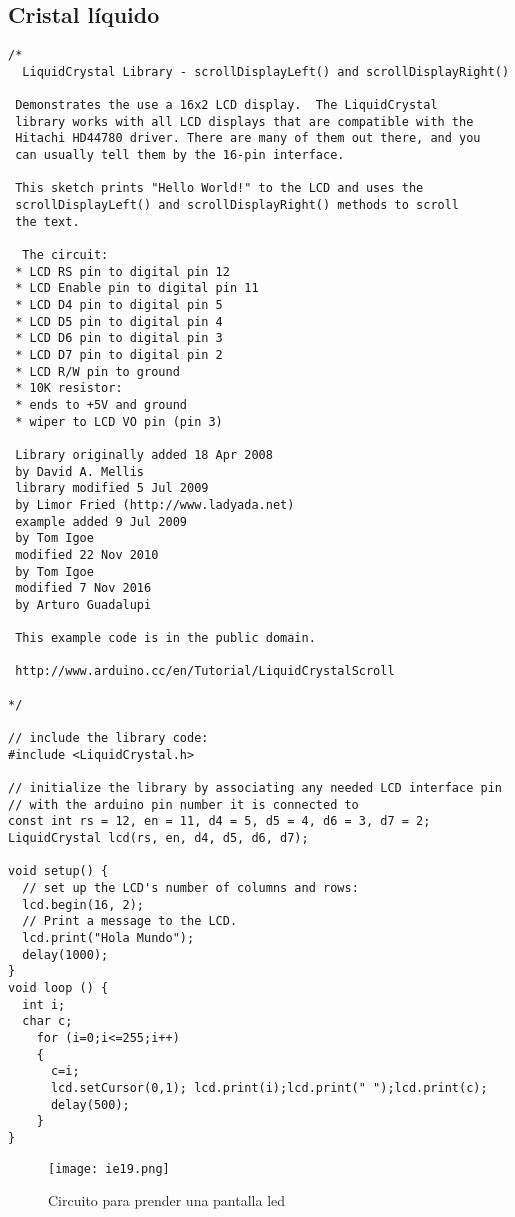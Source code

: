 \subsection{Cristal líquido}
\begin{lstlisting}[style=cFrameTB, gobble=4]
/*
  LiquidCrystal Library - scrollDisplayLeft() and scrollDisplayRight()

 Demonstrates the use a 16x2 LCD display.  The LiquidCrystal
 library works with all LCD displays that are compatible with the
 Hitachi HD44780 driver. There are many of them out there, and you
 can usually tell them by the 16-pin interface.

 This sketch prints "Hello World!" to the LCD and uses the
 scrollDisplayLeft() and scrollDisplayRight() methods to scroll
 the text.

  The circuit:
 * LCD RS pin to digital pin 12
 * LCD Enable pin to digital pin 11
 * LCD D4 pin to digital pin 5
 * LCD D5 pin to digital pin 4
 * LCD D6 pin to digital pin 3
 * LCD D7 pin to digital pin 2
 * LCD R/W pin to ground
 * 10K resistor:
 * ends to +5V and ground
 * wiper to LCD VO pin (pin 3)

 Library originally added 18 Apr 2008
 by David A. Mellis
 library modified 5 Jul 2009
 by Limor Fried (http://www.ladyada.net)
 example added 9 Jul 2009
 by Tom Igoe
 modified 22 Nov 2010
 by Tom Igoe
 modified 7 Nov 2016
 by Arturo Guadalupi

 This example code is in the public domain.

 http://www.arduino.cc/en/Tutorial/LiquidCrystalScroll

*/

// include the library code:
#include <LiquidCrystal.h>

// initialize the library by associating any needed LCD interface pin
// with the arduino pin number it is connected to
const int rs = 12, en = 11, d4 = 5, d5 = 4, d6 = 3, d7 = 2;
LiquidCrystal lcd(rs, en, d4, d5, d6, d7);

void setup() {
  // set up the LCD's number of columns and rows:
  lcd.begin(16, 2);
  // Print a message to the LCD.
  lcd.print("Hola Mundo");
  delay(1000);
}
void loop () {
  int i;
  char c;
  	for (i=0;i<=255;i++)
    {
      c=i;
      lcd.setCursor(0,1); lcd.print(i);lcd.print(" ");lcd.print(c);
      delay(500);
    }
}
\end{lstlisting}
\begin{figure}[h!]
\centering
  \texttt{[image: ie19.png]}
  \caption{Circuito para prender una pantalla led}
  \label{ie19}
\end{figure}

